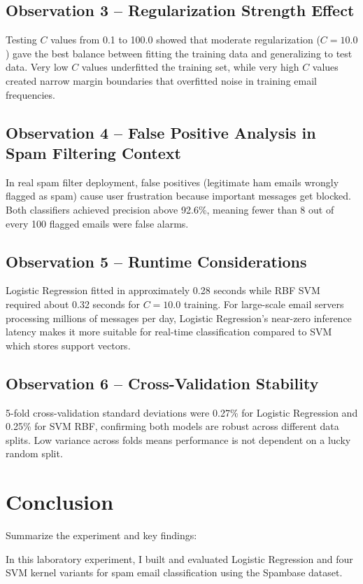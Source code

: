 \documentclass[12pt,a4paper]{article}
\begin{document}
\subsection*{Observation 3 -- Regularization Strength Effect}
Testing $C$ values from 0.1 to 100.0 showed that moderate regularization ($C=10.0$) gave the best balance between fitting the training data and generalizing to test data. Very low $C$ values underfitted the training set, while very high $C$ values created narrow margin boundaries that overfitted noise in training email frequencies.

\subsection*{Observation 4 -- False Positive Analysis in Spam Filtering Context}
In real spam filter deployment, false positives (legitimate ham emails wrongly flagged as spam) cause user frustration because important messages get blocked. Both classifiers achieved precision above 92.6\%, meaning fewer than 8 out of every 100 flagged emails were false alarms.

\subsection*{Observation 5 -- Runtime Considerations}
Logistic Regression fitted in approximately 0.28 seconds while RBF SVM required about 0.32 seconds for $C=10.0$ training. For large-scale email servers processing millions of messages per day, Logistic Regression's near-zero inference latency makes it more suitable for real-time classification compared to SVM which stores support vectors.

\subsection*{Observation 6 -- Cross-Validation Stability}
5-fold cross-validation standard deviations were 0.27\% for Logistic Regression and 0.25\% for SVM RBF, confirming both models are robust across different data splits. Low variance across folds means performance is not dependent on a lucky random split.

\section{Conclusion}
Summarize the experiment and key findings:

In this laboratory experiment, I built and evaluated Logistic Regression and four SVM kernel variants for spam email classification using the Spambase dataset.
\end{document}
